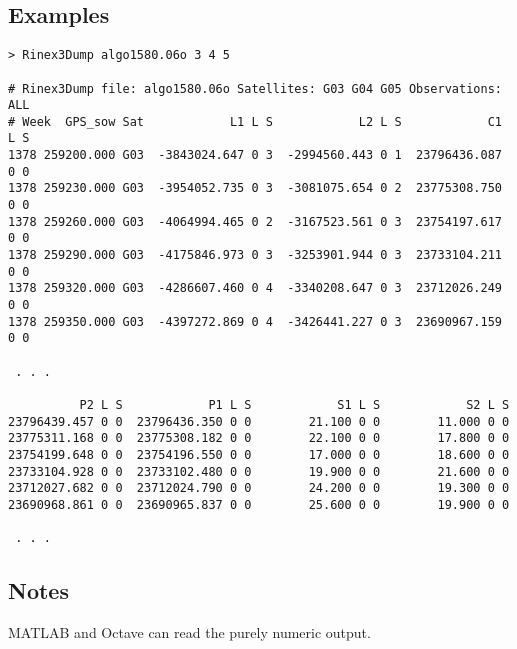\subsection{Examples}
\begin{\outputsize}
\begin{lstlisting}
> Rinex3Dump algo1580.06o 3 4 5

# Rinex3Dump file: algo1580.06o Satellites: G03 G04 G05 Observations: ALL
# Week  GPS_sow Sat            L1 L S            L2 L S            C1 L S
1378 259200.000 G03  -3843024.647 0 3  -2994560.443 0 1  23796436.087 0 0
1378 259230.000 G03  -3954052.735 0 3  -3081075.654 0 2  23775308.750 0 0
1378 259260.000 G03  -4064994.465 0 2  -3167523.561 0 3  23754197.617 0 0
1378 259290.000 G03  -4175846.973 0 3  -3253901.944 0 3  23733104.211 0 0
1378 259320.000 G03  -4286607.460 0 4  -3340208.647 0 3  23712026.249 0 0
1378 259350.000 G03  -4397272.869 0 4  -3426441.227 0 3  23690967.159 0 0

 . . .

          P2 L S            P1 L S            S1 L S            S2 L S
23796439.457 0 0  23796436.350 0 0        21.100 0 0        11.000 0 0
23775311.168 0 0  23775308.182 0 0        22.100 0 0        17.800 0 0
23754199.648 0 0  23754196.550 0 0        17.000 0 0        18.600 0 0
23733104.928 0 0  23733102.480 0 0        19.900 0 0        21.600 0 0
23712027.682 0 0  23712024.790 0 0        24.200 0 0        19.300 0 0
23690968.861 0 0  23690965.837 0 0        25.600 0 0        19.900 0 0

 . . .
\end{lstlisting}
\end{\outputsize}

\subsection{Notes}
MATLAB and Octave can read the purely numeric output.

%
